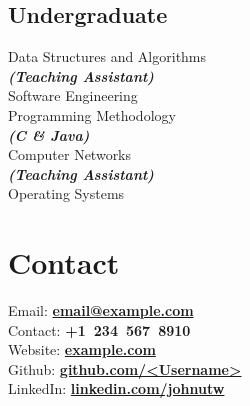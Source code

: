 \documentclass[a4paper]{deedy-resume-openfont} %
\begin{document}
\begin{minipage}[t]{0.34\textwidth}
\subsection{Undergraduate}
Data Structures and Algorithms \\
{\footnotesize \textit{\textbf{(Teaching Assistant) }}} \\
Software Engineering \\
Programming Methodology \\
{\footnotesize \textit{\textbf{(C \& Java) }}} \\
Computer Networks \\
{\footnotesize \textit{\textbf{(Teaching Assistant) }}} \\
Operating Systems \\
\sectionsep


\section{Contact} 
Email: \href{mailto:email@example.com}{\bf email@example.com} \\
Contact: {\bf +1\ 234\ 567\ 8910}  \\
Website: \href{https://example.com}{\bf example.com} \\
Github: \href{https://github.com/}{\bf github.com/<Username>} \\
LinkedIn:  \href{ https://linkedin.com/johnutw}{\bf linkedin.com/johnutw} \\
\sectionsep

%
%

\end{minipage} 
\end{document}
